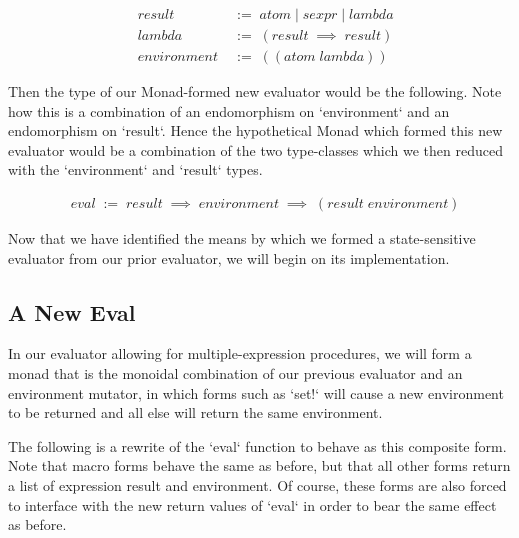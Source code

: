 \begin{align*}
& result \; &:= \; atom \; | \; sexpr \; | \; lambda
\\& lambda \; &:= \; (result \; \implies \; result)
\\& environment \; &:= \; ((atom \; lambda))
\end{align*}

Then the type of our Monad-formed new evaluator would be the following. Note
how this is a combination of an endomorphism on `environment` and an 
endomorphism on `result`. Hence the hypothetical Monad which formed this new
evaluator would be a combination of the two type-classes which we then
reduced with the `environment` and `result` types.

\begin{align*}
& eval \; := \; result \; \implies \; environment \; \implies \; (result \; environment)
\end{align*}

Now that we have identified the means by which we formed a state-sensitive
evaluator from our prior evaluator, we will begin on its implementation.

\subsection{A New Eval}
In our evaluator allowing for multiple-expression procedures, we will form a 
monad that is the monoidal combination of our previous evaluator and an 
environment mutator, in which forms such as `set!` will cause a new
environment to be returned and all else will return the same environment.

The following is a rewrite of the `eval` function to behave as this composite
form. Note that macro forms behave the same as before, but that all other
forms return a list of expression result and environment. Of course, these
forms are also forced to interface with the new return values of `eval` in
order to bear the same effect as before.

